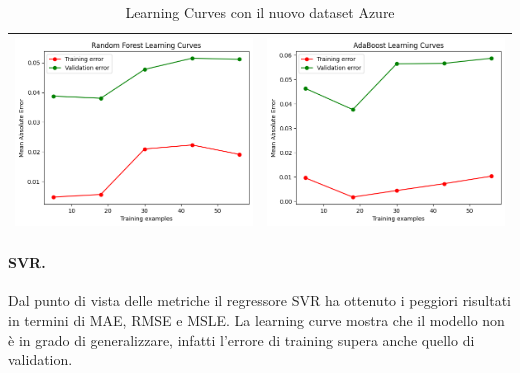 \begin{table}[H]
\begin{tabularx}{\textwidth}{|X|X|}
        \includegraphics[width=\linewidth, trim=0 0 0 0]{images/RandomForestRegressor_Azure_lc2.png} &
        \includegraphics[width=\linewidth, trim=0 0 0 0]{images/AdaBoostRegressor_Azure_lc2.png} \\
        \hline
    \end{tabularx}
    \caption{Learning Curves con il nuovo dataset Azure}
    \label{tab:emissions_info}
\end{table}

\paragraph{\textbf{SVR}.}
Dal punto di vista delle metriche il regressore SVR ha ottenuto i peggiori risultati in termini di MAE, RMSE e MSLE. La learning curve mostra che il modello non è in grado di generalizzare, infatti l'errore di training supera anche quello di validation.

